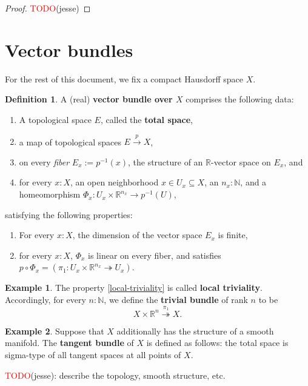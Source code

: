 \documentclass[11pt]{article}
\newcommand{\R}{\mathbb{R}}
\newcommand{\remph}[1]{\textcolor{red}{#1}}
\newcommand{\TODO}{\remph{TODO}}
\theoremstyle{plain}
\theoremstyle{definition}
\newtheorem{definition}{Definition}[section]
\newtheorem{example}{Example}[section]
\newcommand{\N}{\mathbb{N}}
\begin{document}
\begin{proof}
  \TODO(jesse)
\end{proof}

\section{Vector bundles}
For the rest of this document, we fix a compact Hausdorff space \(X\).
\begin{definition}

\label{def:vector-bundle}
 A (real) \textbf{vector bundle over \(X\)} comprises the following data:
  \begin{enumerate}[label={(\roman*)}]
  \item A topological space \(E\), called the \textbf{total space},
  \item a map of topological spaces \(E \overset{p}{\to} X\),
  \item on every \emph{fiber} \(E_x := p^{-1}(x)\), the structure of an \(\R\)-vector space on \(E_x\), and
  \item for every \(x : X\), an open neighborhood \(x \in U_x \subseteq X\), an \(n_x : \N\), and a homeomorphism \(\Phi_x : U_x \times \R^{n_x} \to p^{-1}(U)\),
  \end{enumerate}

  satisfying the following properties:
\begin{enumerate}[label={(\alph*)}]
  \item For every \(x : X\), the dimension of the vector space \(E_x\) is finite,
  \item \label{local-triviality} for every \(x : X\), \(\Phi_x\) is linear on every fiber, and satisfies \(p \circ \Phi_x = (\pi_1 : U_x \times \R^{n_x} \twoheadrightarrow U_x)\).
\end{enumerate}  
\end{definition}

\begin{example}\label{example-trivial-bundle}
  The property \ref{local-triviality} is called \textbf{local triviality}. Accordingly, for every \(n : \N\), we define the \textbf{trivial bundle} of rank \(n\) to be
  \[
    X \times \R^n \overset{\pi_1}{\twoheadrightarrow} X.
  \]
\end{example}

\begin{example}\label{example-tangent-bundle}
  Suppose that \(X\) additionally has the structure of a smooth manifold. The \textbf{tangent bundle} of \(X\) is defined as follows: the total space is sigma-type of all tangent spaces at all points of \(X\).

  \TODO(jesse): describe the topology, smooth structure, etc.
\end{example}
\end{document}
